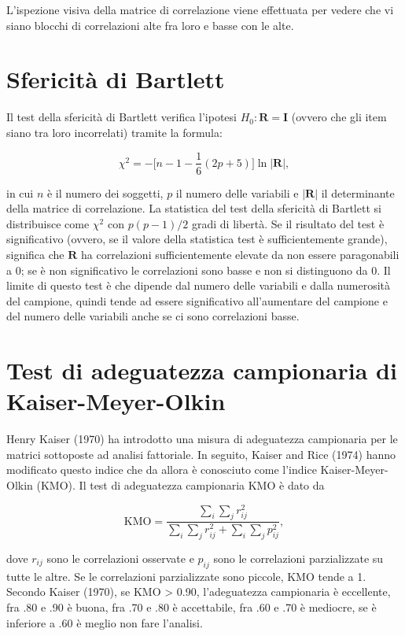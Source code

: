 \documentclass[
  11pt,
]{krantz}
\theoremstyle{definition}
\theoremstyle{definition}
\theoremstyle{definition}
\theoremstyle{definition}
\theoremstyle{remark}
\begin{document}
L'ispezione visiva della matrice di correlazione viene effettuata per vedere che vi siano blocchi di correlazioni alte fra loro e basse con le alte.

\hypertarget{sfericituxe0-di-bartlett}{%
\section{Sfericità di Bartlett}\label{sfericituxe0-di-bartlett}}

Il test della sfericità di Bartlett verifica l'ipotesi \(H_0 : \boldsymbol{R} = \boldsymbol{I}\) (ovvero che gli item siano tra loro incorrelati) tramite la formula:

\[\chi^2 = -\bigg[n -1 -\frac{1}{6} (2p +5)\bigg] \ln |\boldsymbol{R}|,\]

in cui \(n\) è il numero dei soggetti, \(p\) il numero delle variabili e \(|\boldsymbol{R}|\) il determinante della matrice di correlazione. La statistica del test della sfericità di Bartlett si distribuisce come \(\chi^2\) con \(p(p - 1)/2\) gradi di libertà. Se il risultato del test è significativo (ovvero, se il valore della statistica test è sufficientemente grande), significa che \(\boldsymbol{R}\) ha correlazioni sufficientemente elevate da non essere paragonabili a 0; se è non significativo le correlazioni sono basse e non si distinguono da 0. Il limite di questo test è che dipende dal numero delle variabili e dalla numerosità del campione, quindi tende ad essere significativo all'aumentare del campione e del numero delle variabili anche se ci sono correlazioni basse.

\hypertarget{test-di-adeguatezza-campionaria-di-kaiser-meyer-olkin}{%
\section{Test di adeguatezza campionaria di Kaiser-Meyer-Olkin}\label{test-di-adeguatezza-campionaria-di-kaiser-meyer-olkin}}

Henry Kaiser (1970) ha introdotto una misura di adeguatezza campionaria per le matrici sottoposte ad analisi fattoriale. In seguito, Kaiser and Rice (1974) hanno modificato questo indice che da allora è conosciuto come l'indice Kaiser-Meyer-Olkin (KMO). Il test di adeguatezza campionaria KMO è dato da

\[\text{KMO} = \frac{\sum_i\sum_j r^2_{ij}}{\sum_i\sum_j r^2_{ij} +\sum_i\sum_jp^2_{ij}},\]

dove \(r_{ij}\) sono le correlazioni osservate e \(p_{ij}\) sono le correlazioni parzializzate su tutte le altre. Se le correlazioni parzializzate sono piccole, KMO tende a 1. Secondo Kaiser (1970), se KMO \textgreater{} 0.90, l'adeguatezza campionaria è eccellente, fra .80 e .90 è buona, fra .70 e .80 è accettabile, fra .60 e .70 è mediocre, se è inferiore a .60 è meglio non fare l'analisi.
\end{document}

